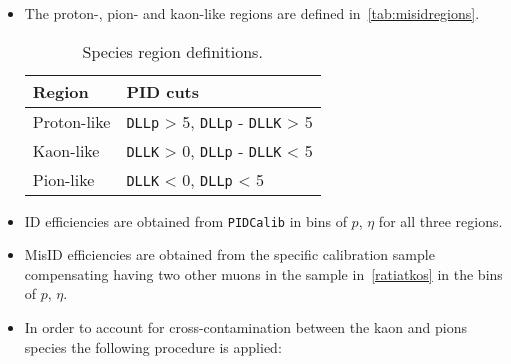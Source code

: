 \begin {itemize}
\item The proton-, pion- and kaon-like regions are defined in~\autoref{tab:misidregions}.

\begin{table}[ht]
\begin{center}
\begin{tabular}[t]{ l  l }
\toprule
Region & PID cuts  \\ \hline
Proton-like & \texttt{DLLp}  > 5, \texttt{DLLp} - \texttt{DLLK} > 5 \\
Kaon-like & \texttt{DLLK} > 0, \texttt{DLLp} - \texttt{DLLK} < 5 \\
Pion-like &  \texttt{DLLK} < 0, \texttt{DLLp} < 5 \\ \bottomrule
\end{tabular}
\end{center}
\caption{Species region definitions.}
\label{tab:misidregions}
\end{table}

\item ID efficiencies are obtained from \texttt{PIDCalib} in bins of $p$, $\eta$ for all three regions.
\item MisID efficiencies are obtained from the specific calibration sample compensating having two other muons in the sample in~\autoref{ratiatkos} in the bins of $p$, $\eta$.
\item In order to account for cross-contamination between the kaon and pions species the following procedure is applied:


\end{itemize}

